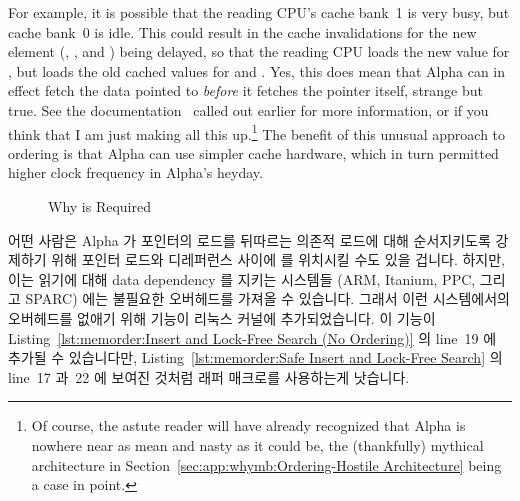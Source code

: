 For example, it is possible that the reading CPU's cache bank~1 is very
busy, but cache bank~0 is idle.
This could result in the cache invalidations for the new element
(, , and ) being
delayed, so that the reading CPU loads the new value for ,
but loads the old cached values for  and .
Yes, this does mean that Alpha can in effect fetch
the data pointed to {\em before} it fetches the pointer itself, strange
but true.
See the documentation~\cite{Compaq01,WilliamPugh2000Gharachorloo}
called out earlier for more information,
or if you think that I am just making all this up.\footnote{
	Of course, the astute reader will have already recognized that
	Alpha is nowhere near as mean and nasty as it could be,
	the (thankfully) mythical architecture in
	Section~\ref{sec:app:whymb:Ordering-Hostile Architecture}
	being a case in point.}
The benefit of this unusual approach to ordering is that Alpha can use
simpler cache hardware, which in turn permitted higher clock frequency
in Alpha's heyday.
\fi

\begin{figure}[tbp]
\centering
{}
\caption{Why  is Required}
\label{fig:memorder:Why smp-read-barrier-depends() is Required}
\end{figure}

어떤 사람은 Alpha 가 포인터의 로드를 뒤따르는 의존적 로드에 대해 순서지키도록
강제하기 위해 포인터 로드와 디레퍼런스 사이에  를 위치시킬 수도
있을 겁니다.
하지만, 이는 읽기에 대해 data dependency 를 지키는 시스템들 (ARM, Itanium, PPC,
그리고 SPARC) 에는 불필요한 오버헤드를 가져올 수 있습니다.
그래서 이런 시스템에서의 오버헤드를 없애기 위해 
기능이 리눅스 커널에 추가되었습니다.
이 기능이
Listing~\ref{lst:memorder:Insert and Lock-Free Search (No Ordering)} 의 line~19
에 추가될 수 있습니다만,
Listing~\ref{lst:memorder:Safe Insert and Lock-Free Search} 의 line~17 과~22 에
보여진 것처럼  래퍼 매크로를 사용하는게 낫습니다.
\iffalse

